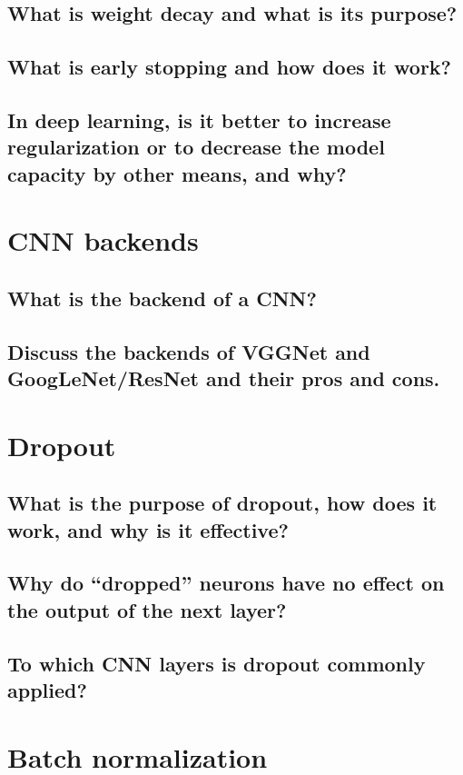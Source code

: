 \subsection{What is weight decay and what is its purpose?}
\subsection{What is early stopping and how does it work?}
\subsection{In deep learning, is it better to increase regularization or to decrease the model capacity by other means, and why?}



\section{CNN backends}
\subsection{What is the backend of a CNN?}
\subsection{Discuss the backends of VGGNet and GoogLeNet/ResNet and their pros and cons.}




\section{Dropout}
\subsection{What is the purpose of dropout, how does it work, and why is it effective?}
\subsection{Why do ``dropped'' neurons have no effect on the output of the next layer?}
\subsection{To which CNN layers is dropout commonly applied?}

\section{Batch normalization}
